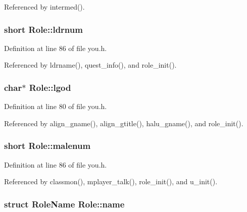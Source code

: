 Referenced by intermed().

\hypertarget{structRole_a0540f9522a3678aa359d4d84ad7c9f28}{
\subsubsection[{ldrnum}]{\setlength{\rightskip}{0pt plus 5cm}short Role\+::ldrnum}}\label{structRole_a0540f9522a3678aa359d4d84ad7c9f28}


Definition at line 86 of file you.\+h.



Referenced by ldrname(), quest\+\_\+info(), and role\+\_\+init().

\hypertarget{structRole_a71dfd97228277634b596856f4732e74b}{
\subsubsection[{lgod}]{ char$\ast$ Role\+::lgod}}\label{structRole_a71dfd97228277634b596856f4732e74b}


Definition at line 80 of file you.\+h.



Referenced by align\+\_\+gname(), align\+\_\+gtitle(), halu\+\_\+gname(), and role\+\_\+init().

\hypertarget{structRole_aa88f771ec189bdfc9d50fd7e9a9800df}{
\subsubsection[{malenum}]{\setlength{\rightskip}{0pt plus 5cm}short Role\+::malenum}}\label{structRole_aa88f771ec189bdfc9d50fd7e9a9800df}


Definition at line 86 of file you.\+h.



Referenced by classmon(), mplayer\+\_\+talk(), role\+\_\+init(), and u\+\_\+init().

\hypertarget{structRole_aca88aa13366db080d9a996e0c8a6c767}{
\subsubsection[{name}]{\setlength{\rightskip}{0pt plus 5cm}struct {\bf Role\+Name} Role\+::name}}\label{structRole_aca88aa13366db080d9a996e0c8a6c767}


